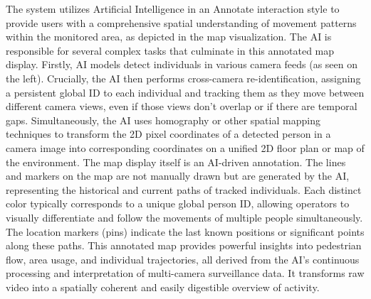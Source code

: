 The system utilizes Artificial Intelligence in an Annotate interaction style to provide users with a comprehensive spatial understanding of movement patterns within the monitored area, as depicted in the map visualization. The AI is responsible for several complex tasks that culminate in this annotated map display.
Firstly, AI models detect individuals in various camera feeds (as seen on the left). Crucially, the AI then performs cross-camera re-identification, assigning a persistent global ID to each individual and tracking them as they move between different camera views, even if those views don't overlap or if there are temporal gaps. Simultaneously, the AI uses homography or other spatial mapping techniques to transform the 2D pixel coordinates of a detected person in a camera image into corresponding coordinates on a unified 2D floor plan or map of the environment.
The map display itself is an AI-driven annotation. The lines and markers on the map are not manually drawn but are generated by the AI, representing the historical and current paths of tracked individuals. Each distinct color typically corresponds to a unique global person ID, allowing operators to visually differentiate and follow the movements of multiple people simultaneously. The location markers (pins) indicate the last known positions or significant points along these paths. This annotated map provides powerful insights into pedestrian flow, area usage, and individual trajectories, all derived from the AI's continuous processing and interpretation of multi-camera surveillance data. It transforms raw video into a spatially coherent and easily digestible overview of activity.


